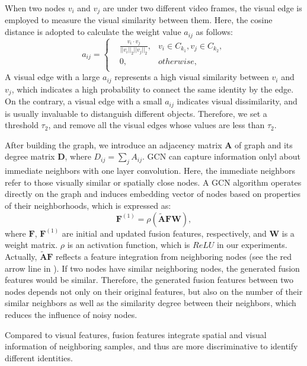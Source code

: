 \documentclass[10pt,twocolumn,letterpaper]{article}
\begin{document}
When two nodes $v_i$ and $v_j$ are under two different video frames, the visual edge is employed to measure the visual similarity between them.
Here, the cosine distance is adopted to calculate the weight value $a_{ij}$ as follows:
\begin{equation}
a_{ij}=\left\{ \begin{aligned}
& \frac{v_i \cdot v_j}{||v_i ||_2 ||v_j||_2}, & v_i \in C_{k_1}, v_j \in C_{k_2}, \\
& 0, & otherwise, \\
\end{aligned} \right.
\label{equa:weight_value}
\end{equation}
A visual edge with a large $a_{ij}$ represents a high visual similarity between $v_i$ and $v_j$, which indicates a high probability to connect the same identity by the edge.
On the contrary, a visual edge with a small $a_{ij}$ indicates visual dissimilarity, and is usually invaluable to distanguish different objects.
Therefore, we set a threshold $\tau_2$, and remove all the visual edges whose values are less than $\tau_2$. 

After building the graph, we introduce an adjacency matrix $\boldsymbol{A}$ of graph and its degree matrix $\boldsymbol{D}$, where $D_{ij}=\sum_j A_{ij}$.
GCN can capture information onlyl about immediate neighbors with one layer convolution.
Here, the immediate neighbors refer to those visually similar or spatially close nodes. 
A GCN algorithm operates directly on the graph and induces embedding vector of nodes based on properties of their neighborhoods, which is expressed as:
\begin{equation}
\boldsymbol{F}^{(1)} = \rho(\tilde{\boldsymbol{A}}\boldsymbol{FW}),
\end{equation}
where $\boldsymbol{F}$, $\boldsymbol{F}^(1)$ are initial and updated fusion features, respectively,
and $\boldsymbol{W}$ is a weight matrix.
$\rho$ is an activation function, which is $ReLU$ in our experiments.
Actually, $\tilde{\boldsymbol{A}}\boldsymbol{F}$ reflects a feature integration from neighboring nodes (see the red arrow line in ).
If two nodes have similar neighboring nodes, the generated fusion features would be similar.
Therefore, the generated fusion features between two nodes depends not only on their original features, but also on the number of their similar neighbors as well as the similarity degree between their neighbors, which reduces the influence of noisy nodes. 

Compared to visual features, fusion features integrate spatial and visual information of neighboring samples, and thus are more discriminative to identify different identities.
\end{document}
